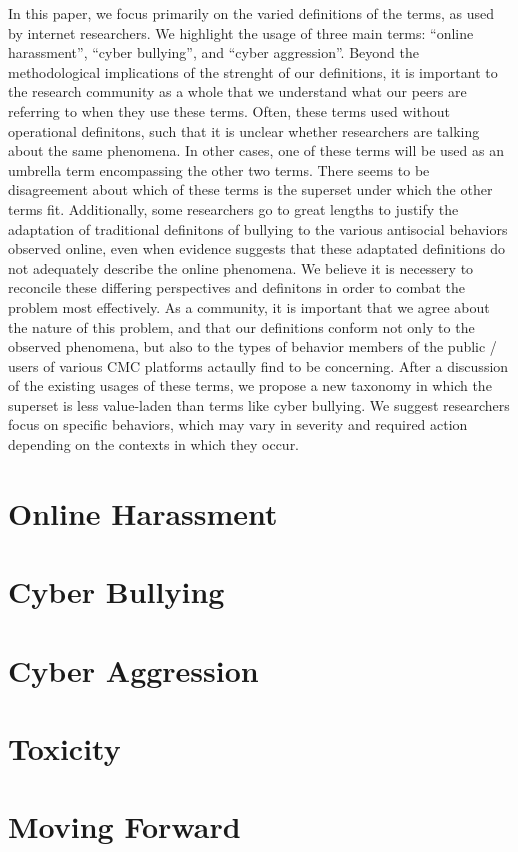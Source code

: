 \documentclass{sigchi}
\begin{document}
In this paper, we focus primarily on the varied definitions of the terms, as used by internet researchers.  We highlight the usage of three main terms: ``online harassment'', ``cyber bullying'', and ``cyber aggression''.  Beyond the methodological implications of the strenght of our definitions, it is important to the research community as a whole that we understand what our peers are referring to when they use these terms.  Often, these terms used without operational definitons, such that it is unclear whether researchers are talking about the same phenomena.  In other cases, one of these terms will be used as an umbrella term encompassing the other two terms.  There seems to be disagreement about which of these terms is the superset under which the other terms fit.  Additionally, some researchers go to great lengths to justify the adaptation of traditional definitons of bullying to the various antisocial behaviors observed online, even when evidence suggests that these adaptated definitions do not adequately describe the online phenomena.  We believe it is necessery to reconcile these differing perspectives and definitons in order to combat the problem most effectively.  As a community, it is important that we agree about the nature of this problem, and that our definitions conform not only to the observed phenomena, but also to the types of behavior members of the public / users of various CMC platforms actaully find to be concerning.  After a discussion of the existing usages of these terms, we propose a new taxonomy in which the superset is less value-laden than terms like cyber bullying.  We suggest researchers focus on specific behaviors, which may vary in severity and required action depending on the contexts in which they occur.

\section{Online Harassment}

\section{Cyber Bullying}

\section{Cyber Aggression}

\section{Toxicity}

\section{Moving Forward}

\balance{}



\end{document}
